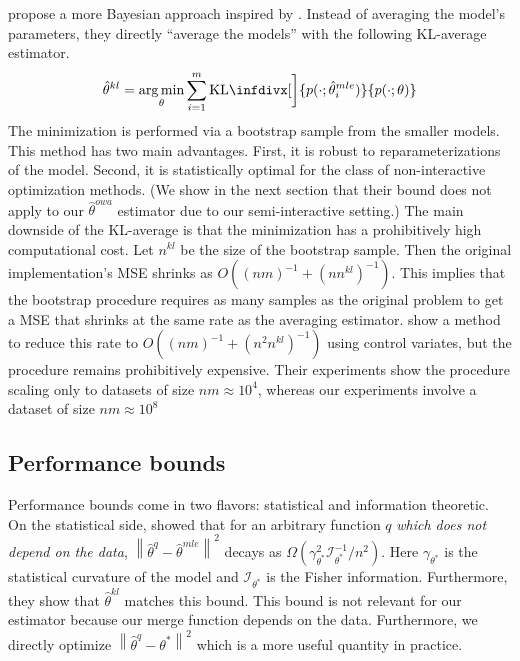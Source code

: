 \documentclass[twoside]{article}
\DeclareMathOperator*{\argmin}{arg\,min}
\newcommand{\w}{\theta}
\newcommand{\wkl}{\hat\w^{kl}}
\newcommand{\wreopt}{\hat\w^{owa}}
\newcommand{\wave}{\hat\w^{ave}}
\newcommand{\wmle}{\hat\w^{mle}}
\newcommand{\wstar}{{\w^{*}}}
\newcommand{\wq}{\hat\w^{q}}
\newcommand{\I}{\mathcal I}
\newcommand{\ltwo}[1]{{\left\lVert {#1} \right\rVert}}
\newcommand{\kl}{\text{KL}\infdivx}
\begin{document}

\cite{liu2014distributed} propose a more Bayesian approach inspired by \cite{merugu2003privacy}.
Instead of averaging the model's parameters,
they directly ``average the models'' with the following KL-average estimator.
\begin{equation}
\wkl = \argmin_\w \sum_{i=1}^m \kl[\bigg]{p(\cdot;\wmle_i)}{p(\cdot;\w)}
\end{equation}
The minimization is performed via a bootstrap sample from the smaller models.
This method has two main advantages.
First, it is robust to reparameterizations of the model.
Second, it is statistically optimal for the class of non-interactive optimization methods.
(We show in the next section that their bound does not apply to our $\wreopt$ estimator due to our semi-interactive setting.)
The main downside of the KL-average is that the minimization has a prohibitively high computational cost.
Let $n^{kl}$ be the size of the bootstrap sample.
Then the original implementation's MSE shrinks as $O((nm)^{-1}+(nn^{kl})^{-1})$.
This implies that the bootstrap procedure requires as many samples as the original problem to get a MSE that shrinks at the same rate as the averaging estimator.
\cite{han2016bootstrap} show a method to reduce this rate to $O((nm)^{-1}+(n^2n^{kl})^{-1})$ using control variates, but the procedure remains prohibitively expensive.
Their experiments show the procedure scaling only to datasets of size $nm\approx10^4$,
whereas our experiments involve a dataset of size $nm\approx10^8$

\subsection{Performance bounds}
\label{sec:bounds}

Performance bounds come in two flavors: statistical and information theoretic.
On the statistical side, \cite{liu2014distributed} showed that for an arbitrary function $q$ \emph{which does not depend on the data},
$\ltwo{\wq-\wmle}^2$ decays as $\Omega(\gamma^2_\wstar \I^{-1}_\wstar/n^2)$.
Here $\gamma_\wstar$ is the statistical curvature of the model and $\I_\wstar$ is the Fisher information.
Furthermore, they show that $\wkl$ matches this bound.
This bound is not relevant for our estimator because our merge function depends on the data.
Furthermore, we directly optimize $\ltwo{\wq-\wstar}^2$ which is a more useful quantity in practice.
\end{document}
